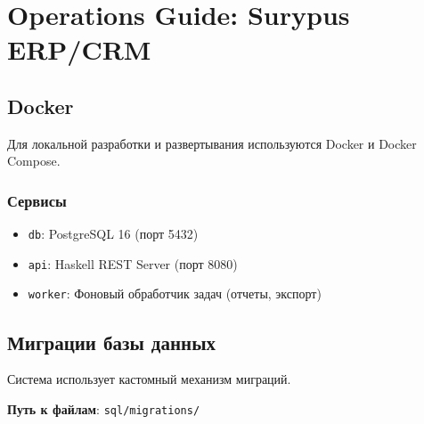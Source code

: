 \chapter{Operations Guide: Surypus
ERP/CRM}\label{operations-guide-surypus-erpcrm}

\section{Docker}\label{docker}

Для локальной разработки и развертывания используются Docker и Docker
Compose.

\begin{Shaded}
\begin{Highlighting}[]

\end{Highlighting}
\end{Shaded}

\subsection{Сервисы}\label{ux441ux435ux440ux432ux438ux441ux44b}

\begin{itemize}
\tightlist
\item
  \texttt{db}: PostgreSQL 16 (порт 5432)
\item
  \texttt{api}: Haskell REST Server (порт 8080)
\item
  \texttt{worker}: Фоновый обработчик задач (отчеты, экспорт)
\end{itemize}

\section{Миграции базы
данных}\label{ux43cux438ux433ux440ux430ux446ux438ux438-ux431ux430ux437ux44b-ux434ux430ux43dux43dux44bux445}

Система использует кастомный механизм миграций.

\textbf{Путь к файлам}: \texttt{sql/migrations/}

\begin{Shaded}
\begin{Highlighting}[]
\end{Highlighting}
\end{Shaded}

